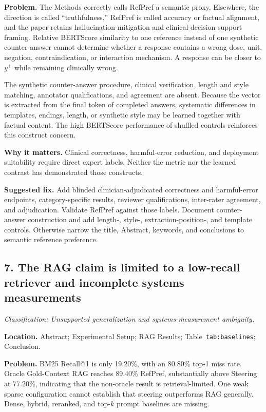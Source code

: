 \documentclass[11pt]{article}
\newcommand{\findinglabel}[1]{\textbf{#1}}
\newcommand{\classification}[1]{\textit{Classification: #1.}}
\begin{document}
\findinglabel{Problem.} The Methods correctly calls RefPref a semantic proxy.  Elsewhere, the direction is called ``truthfulness,'' RefPref is called accuracy or factual alignment, and the paper retains hallucination-mitigation and clinical-decision-support framing.  Relative BERTScore similarity to one reference instead of one synthetic counter-answer cannot determine whether a response contains a wrong dose, unit, negation, contraindication, or interaction mechanism.  A response can be closer to $y^+$ while remaining clinically wrong.

The synthetic counter-answer procedure, clinical verification, length and style matching, annotator qualifications, and agreement are absent.  Because the vector is extracted from the final token of completed answers, systematic differences in templates, endings, length, or synthetic style may be learned together with factual content.  The high BERTScore performance of shuffled controls reinforces this construct concern.

\findinglabel{Why it matters.} Clinical correctness, harmful-error reduction, and deployment suitability require direct expert labels.  Neither the metric nor the learned contrast has demonstrated those constructs.

\findinglabel{Suggested fix.} Add blinded clinician-adjudicated correctness and harmful-error endpoints, category-specific results, reviewer qualifications, inter-rater agreement, and adjudication.  Validate RefPref against those labels.  Document counter-answer construction and add length-, style-, extraction-position-, and template controls.  Otherwise narrow the title, Abstract, keywords, and conclusions to semantic reference preference.

\subsection*{7. The RAG claim is limited to a low-recall retriever and incomplete systems measurements}

\classification{Unsupported generalization and systems-measurement ambiguity}

\findinglabel{Location.} Abstract; Experimental Setup; RAG Results; Table~\texttt{tab:baselines}; Conclusion.

\findinglabel{Problem.} BM25 Recall@1 is only 19.20\%, with an 80.80\% top-1 miss rate.  Oracle Gold-Context RAG reaches 89.40\% RefPref, substantially above Steering at 77.20\%, indicating that the non-oracle result is retrieval-limited.  One weak sparse configuration cannot establish that steering outperforms RAG generally.  Dense, hybrid, reranked, and top-$k$ prompt baselines are missing.
\end{document}
